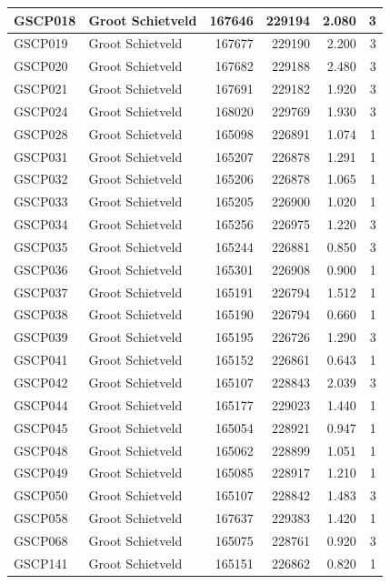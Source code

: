 \documentclass[11pt,]{book}
\begin{document}
\begin{table}
\begin{tabular}[t]{l|l|r|r|r|r}
\hline
GSCP018 & Groot Schietveld & 167646 & 229194 & 2.080 & 3\\
\hline
GSCP019 & Groot Schietveld & 167677 & 229190 & 2.200 & 3\\
\hline
GSCP020 & Groot Schietveld & 167682 & 229188 & 2.480 & 3\\
\hline
GSCP021 & Groot Schietveld & 167691 & 229182 & 1.920 & 3\\
\hline
GSCP024 & Groot Schietveld & 168020 & 229769 & 1.930 & 3\\
\hline
GSCP028 & Groot Schietveld & 165098 & 226891 & 1.074 & 1\\
\hline
GSCP031 & Groot Schietveld & 165207 & 226878 & 1.291 & 1\\
\hline
GSCP032 & Groot Schietveld & 165206 & 226878 & 1.065 & 1\\
\hline
GSCP033 & Groot Schietveld & 165205 & 226900 & 1.020 & 1\\
\hline
GSCP034 & Groot Schietveld & 165256 & 226975 & 1.220 & 3\\
\hline
GSCP035 & Groot Schietveld & 165244 & 226881 & 0.850 & 3\\
\hline
GSCP036 & Groot Schietveld & 165301 & 226908 & 0.900 & 1\\
\hline
GSCP037 & Groot Schietveld & 165191 & 226794 & 1.512 & 1\\
\hline
GSCP038 & Groot Schietveld & 165190 & 226794 & 0.660 & 1\\
\hline
GSCP039 & Groot Schietveld & 165195 & 226726 & 1.290 & 3\\
\hline
GSCP041 & Groot Schietveld & 165152 & 226861 & 0.643 & 1\\
\hline
GSCP042 & Groot Schietveld & 165107 & 228843 & 2.039 & 3\\
\hline
GSCP044 & Groot Schietveld & 165177 & 229023 & 1.440 & 1\\
\hline
GSCP045 & Groot Schietveld & 165054 & 228921 & 0.947 & 1\\
\hline
GSCP048 & Groot Schietveld & 165062 & 228899 & 1.051 & 1\\
\hline
GSCP049 & Groot Schietveld & 165085 & 228917 & 1.210 & 1\\
\hline
GSCP050 & Groot Schietveld & 165107 & 228842 & 1.483 & 3\\
\hline
GSCP058 & Groot Schietveld & 167637 & 229383 & 1.420 & 1\\
\hline
GSCP068 & Groot Schietveld & 165075 & 228761 & 0.920 & 3\\
\hline
GSCP141 & Groot Schietveld & 165151 & 226862 & 0.820 & 1\\

\end{tabular}
\end{table}
\end{document}

